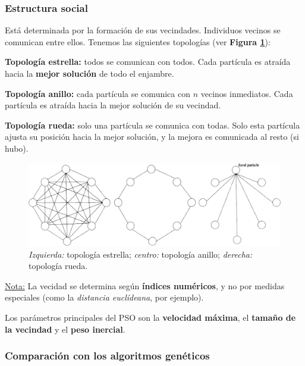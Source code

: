 \documentclass[10pt,a4paper]{article}
\begin{document}
\subsubsection{Estructura social}

Está determinada por la formación de sus vecindades. Individuos vecinos se comunican entre ellos. Tenemos las siguientes topologías (ver \textbf{Figura \ref{fig:PSO}}):
\begin{description}
\item \textbf{Topología estrella:} todos se comunican con todos. Cada partícula es atraída hacia la \textbf{mejor solución} de todo el enjambre.
\item \textbf{Topología anillo:} cada partícula se comunica con $n$ vecinos inmediatos. Cada partícula es atraída hacia la mejor solución de su vecindad.
\item \textbf{Topología rueda:} solo una partícula se comunica con todas. Solo esta partícula ajusta su posición hacia la mejor solución, y la mejora es comunicada al resto (si hubo).
\end{description}

\begin{figure}[ht!]
  \caption{\textit{Izquierda:} topología estrella; \textit{centro:} topología anillo; \textit{derecha:} topología rueda.}
  \label{fig:PSO}
  \centerline{\includegraphics[width=\textwidth-\fboxrule-\fboxrule]{imgs/PSO.png}}
\end{figure}

\underline{Nota:} La vecidad se determina según \textbf{índices numéricos}, y no por medidas especiales (como la \textit{distancia euclídeana}, por ejemplo).

Los parámetros principales del PSO son la \textbf{velocidad máxima}, el \textbf{tamaño de la vecindad} y el \textbf{peso inercial}.

\subsubsection{Comparación con los algoritmos genéticos}
\end{document}
